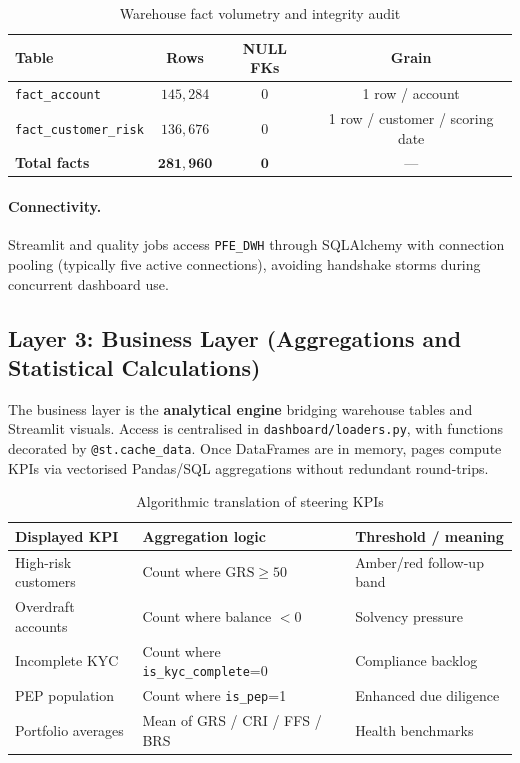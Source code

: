 \begin{table}[H]
\centering
\caption{Warehouse fact volumetry and integrity audit}
\label{tab:dwh_audit}
\renewcommand{\arraystretch}{1.2}
\scriptsize
\begin{tabular}{|p{4.0cm}|c|c|c|}
\hline
\rowcolor{blue!15}
\textbf{Table} & \textbf{Rows} & \textbf{NULL FKs} & \textbf{Grain} \\
\hline
\texttt{fact\_account} & $145{,}284$ & $0$ & 1 row / account \\
\hline
\texttt{fact\_customer\_risk} & $136{,}676$ & $0$ & 1 row / customer / scoring date \\
\hline
\textbf{Total facts} & $\mathbf{281{,}960}$ & $\mathbf{0}$ & --- \\
\hline
\end{tabular}
\end{table}

\paragraph{Connectivity.}
Streamlit and quality jobs access \texttt{PFE\_DWH} through SQLAlchemy with
connection pooling (typically five active connections), avoiding handshake storms
during concurrent dashboard use.

\subsection{Layer 3: Business Layer (Aggregations and Statistical Calculations)}
The business layer is the \textbf{analytical engine} bridging warehouse tables and
Streamlit visuals. Access is centralised in \texttt{dashboard/loaders.py}, with
functions decorated by \texttt{@st.cache\_data}. Once DataFrames are in memory,
pages compute KPIs via vectorised Pandas/SQL aggregations without redundant
round-trips.

\begin{table}[H]
\centering
\caption{Algorithmic translation of steering KPIs}
\label{tab:kpi-calculs}
\renewcommand{\arraystretch}{1.2}
\scriptsize
\begin{tabular}{|p{3.2cm}|p{5.5cm}|p{5.5cm}|}
\hline
\rowcolor{blue!15}
\textbf{Displayed KPI} & \textbf{Aggregation logic} & \textbf{Threshold / meaning} \\
\hline
High-risk customers & Count where $\mathrm{GRS}\ge 50$ & Amber/red follow-up band \\
\hline
Overdraft accounts & Count where balance $<0$ & Solvency pressure \\
\hline
Incomplete KYC & Count where \texttt{is\_kyc\_complete}=0 & Compliance backlog \\
\hline
PEP population & Count where \texttt{is\_pep}=1 & Enhanced due diligence \\
\hline
Portfolio averages & Mean of GRS / CRI / FFS / BRS & Health benchmarks \\
\hline
\end{tabular}
\end{table}

